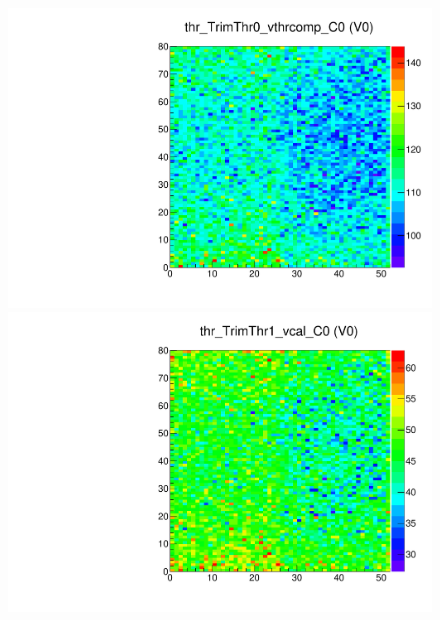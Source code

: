 \begin{figure}[!Hp]
\centering
\begin{minipage}{0.45\textwidth}

  \includegraphics[width=1.0\textwidth]{figures/trim_thr_TrimThr0_vthrcomp.pdf}
  \caption{}
  \label{fig:trim_thr_TrimThr0_vthrcomp}
\end{minipage}
\hspace{0.3cm}
\begin{minipage}{0.45\textwidth}

  \includegraphics[width=1.0\textwidth]{figures/trim_thr_TrimThr1_vcal.pdf}
  \caption{}
  \label{fig:trim_thr_TrimThr1_vcal}
\end{minipage}
\end{figure}

